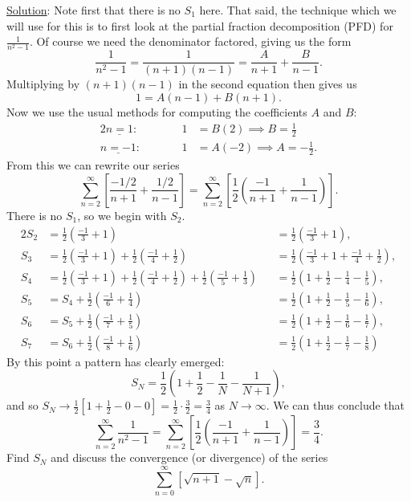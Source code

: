 \underline{Solution}: Note first that there is no $S_1$ here.
That said, the technique which we will use for this
is to first look at the partial fraction decomposition (PFD)
for $\frac1{n^2-1}$.  Of course we need the denominator factored,
giving us the form
$$\frac1{n^2-1}=\frac1{(n+1)(n-1)}=\frac{A}{n+1}+\frac{B}{n-1}.$$
Multiplying by $(n+1)(n-1)$ in the second equation then gives us
$$1=A(n-1)+B(n+1).$$
Now we use the usual methods for computing the coefficients $A$ and $B$:
\begin{alignat*}{2}
\underline{n=1}:&\qquad &1&=B(2)\implies\boxed{B=\frac12}\\
\underline{n=-1}:&\qquad&1&=A(-2)\implies\boxed{A=-\frac12}.
\end{alignat*}
From this we can rewrite our series
$$\sum_{n=2}^\infty
 \left[\frac{-1/2}{n+1}+\frac{1/2}{n-1}\right]
 =\sum_{n=2}^\infty\left[\frac12\left(\frac{-1}{n+1}+\frac1{n-1}\right)\right].
$$
There is no $S_1$, so we begin with $S_2$.
\begin{alignat*}{2}
S_2&=\frac12\left(\frac{-1}{3}+1\right)
       &&=\frac12\left(\frac{-1}{3}+1\right),\\
S_3&=\frac12\left(\frac{-1}{3}+1\right)
       +\frac12\left(\frac{-1}4+\frac12\right)
       &&=\frac12\left(\frac{-1}{3}+1+\frac{-1}4+\frac12\right),\\
S_4&=\frac12\left(\frac{-1}{3}+1\right)
       +\frac12\left(\frac{-1}4+\frac12\right)
       +\frac12\left(\frac{-1}5+\frac13\right)
       &&=\frac12\left(1+\frac12-\frac14-\frac15\right),\\
S_5&=S_4+\frac12\left(\frac{-1}6+\frac14\right)
       &&=\frac12\left(1+\frac12-\frac15-\frac16\right),\\
S_6&=S_5+\frac12\left(\frac{-1}7+\frac15\right)
       &&=\frac12\left(1+\frac12-\frac16-\frac17\right),\\
S_7&=S_6+\frac12\left(\frac{-1}8+\frac16\right)
       &&=\frac12\left(1+\frac12-\frac17-\frac18\right)
\end{alignat*}
By this point a pattern has clearly  emerged:
$$S_N=\frac12\left(1+\frac12-\frac1N-\frac1{N+1}\right),$$
and so 
$S_N\longrightarrow \frac12\left[1+\frac12-0-0\right]=\frac12\cdot\frac32
         =\frac34$ as $N\to\infty$.
We can thus conclude that
$$\sum_{n=2}^\infty\frac1{n^2-1}
  =\sum_{n=2}^\infty
         \left[\frac12\left(\frac{-1}{n+1}+\frac1{n-1}\right)\right]
  =\frac34.$$
\eex
\bex Find $S_N$ and discuss the convergence (or divergence)
     of the series
$$\sum_{n=0}^\infty\left[\sqrt{n+1}-\sqrt{n}\right].$$

